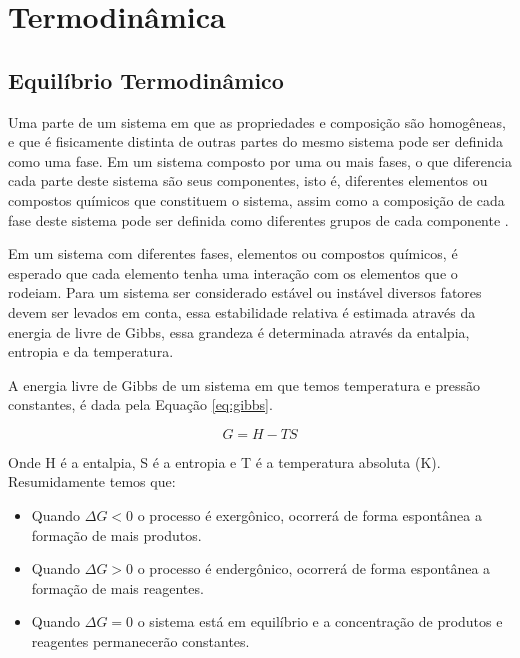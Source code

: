 \section{Termodinâmica}\label{sec:LABEL_CHP_2_SEC_A}

\subsection{Equilíbrio Termodinâmico}\label{sec:LABEL_CHP_2_SEC_A_SUB_A}


Uma parte de um sistema em que as propriedades e composição são homogêneas, e que é fisicamente distinta de outras partes do mesmo sistema pode ser definida como uma fase. Em um sistema composto por uma ou mais fases, o que diferencia cada parte deste sistema são seus componentes, isto é, diferentes elementos ou compostos químicos que constituem o sistema, assim como a composição de cada fase deste sistema pode ser definida como diferentes grupos de cada componente \cite{porter2009phase}.

Em um sistema com diferentes fases, elementos ou compostos químicos, é esperado que cada elemento tenha uma interação com os elementos que o rodeiam. Para um sistema ser considerado estável ou instável diversos fatores devem ser levados em conta, essa estabilidade relativa é estimada através da energia de livre de Gibbs, essa grandeza é determinada através da entalpia, entropia e da temperatura.

A energia livre de Gibbs de um sistema em que temos temperatura e pressão constantes, é dada pela Equação \ref{eq:gibbs}.

\begin{equation} 
G = H - TS
\label{eq:gibbs}
\end{equation}

Onde H é a entalpia, S é a entropia e T é a temperatura absoluta (K). Resumidamente temos que:

\begin{itemize}
  \item Quando $\Delta G < 0$ o processo é exergônico, ocorrerá de forma espontânea a formação de mais produtos.
  \item Quando $\Delta G > 0$ o processo é endergônico, ocorrerá de forma espontânea a formação de mais reagentes.
  \item Quando $\Delta G = 0$ o sistema está em equilíbrio e a concentração de produtos e reagentes permanecerão constantes. \cite{gaskell2012introduction}
\end{itemize}

